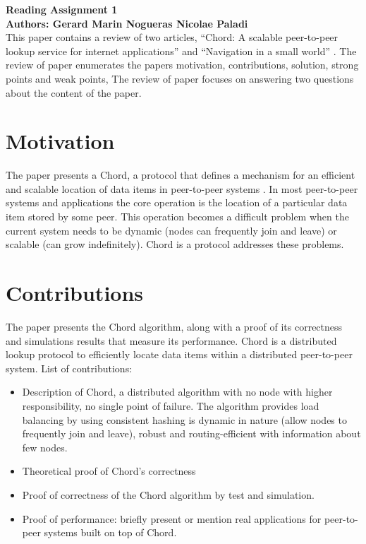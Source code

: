 \documentclass[10pt]{proc}
\begin{document}
\large{\textbf{Reading Assignment 1}}\\

\large{\textbf{Authors: Gerard Marin Nogueras \newline Nicolae Paladi}}\\

This paper contains a review of two articles, ``Chord: A scalable peer-to-peer lookup service for internet applications'' \cite{stoica2001chord} and ``Navigation in a small world'' \cite{kleinberg2000navigation}.
The review of paper \cite{stoica2001chord} enumerates the papers motivation, contributions, solution, strong points and weak points,
The review of paper \cite{kleinberg2000navigation} focuses on answering two questions about the content of the paper.


\section{Motivation}
The paper presents a Chord, a protocol that defines a mechanism for an efficient and scalable location of data items in peer-to-peer systems \cite{stoica2001chord}. 
In most peer-to-peer systems and applications the core operation is the location of a particular data item stored by some peer. 
This operation becomes a difficult problem when the current system needs to be dynamic (nodes can frequently join and leave) or scalable (can grow indefinitely). 
Chord is a protocol addresses these problems.


\section{Contributions}

The paper presents the Chord algorithm, along with a proof of its correctness and simulations results that measure its performance. 
Chord is a distributed lookup protocol to efficiently locate data items within a distributed peer-to-peer system. 
List of contributions:
\begin{itemize}
 \item Description of Chord, a distributed algorithm with no node with higher responsibility, no single point of failure. 
  The algorithm provides load balancing by using consistent hashing is dynamic in nature (allow nodes to frequently join and leave), robust and routing-efficient with information about few nodes.
 \item Theoretical proof of Chord’s correctness
 \item Proof of correctness of the Chord algorithm by test and simulation.
 \item Proof of performance: briefly present or mention real applications for peer-to-peer systems built on top of Chord.
\end{itemize}
\end{document}
